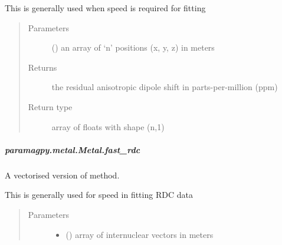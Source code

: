 \documentclass[a4paper,10pt,english]{sphinxmanual}
\begin{document}
\begin{fulllineitems}
\begin{fulllineitems}
\begin{fulllineitems}
This is generally used when speed is required for fitting
\begin{quote}\begin{description}
\item[{Parameters}] \leavevmode
{} (\sphinxstyleliteralemphasis{\sphinxupquote{ (}}\sphinxstyleliteralemphasis{\sphinxupquote{,}}\sphinxstyleliteralemphasis{\sphinxupquote{)}}) \textendash{} an array of ‘n’ positions (x, y, z) in meters

\item[{Returns}] \leavevmode
{} \textendash{} the residual anisotropic dipole shift in parts-per-million (ppm)

\item[{Return type}] \leavevmode
array of floats with shape (n,1)

\end{description}\end{quote}

\end{fulllineitems}



\subparagraph{paramagpy.metal.Metal.fast\_rdc}
\label{\detokenize{reference/generated/paramagpy.metal.Metal.fast_rdc:paramagpy-metal-metal-fast-rdc}}\label{\detokenize{reference/generated/paramagpy.metal.Metal.fast_rdc::doc}}

\begin{fulllineitems}
\label{\detokenize{reference/generated/paramagpy.metal.Metal.fast_rdc:paramagpy.metal.Metal.fast_rdc}}
A vectorised version of {\hyperref[\detokenize{reference/generated/paramagpy.metal.Metal.rdc:paramagpy.metal.Metal.rdc}]{}} method.

This is generally used for speed in fitting RDC data
\begin{quote}\begin{description}
\item[{Parameters}] \leavevmode\begin{itemize}
\item {} 
 (\sphinxstyleliteralemphasis{\sphinxupquote{ (}}\sphinxstyleliteralemphasis{\sphinxupquote{,}}\sphinxstyleliteralemphasis{\sphinxupquote{)}}) \textendash{} array of internuclear vectors in meters


\end{itemize}
\end{description}
\end{quote}
\end{fulllineitems}
\end{fulllineitems}
\end{fulllineitems}
\end{document}
